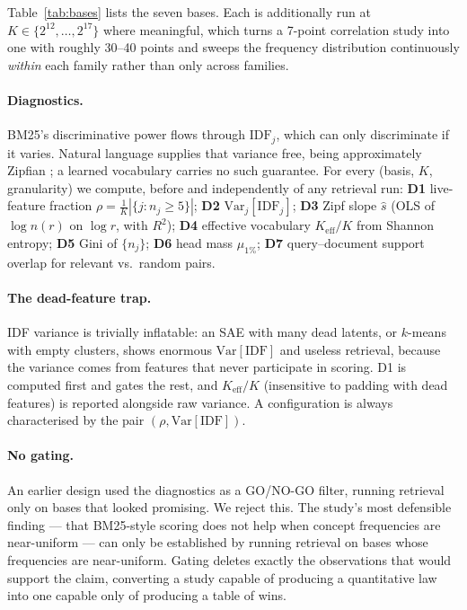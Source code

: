 \documentclass[11pt]{article}
\newcommand{\idf}{\mathrm{IDF}}
\begin{document}
Table~\ref{tab:bases} lists the seven bases. Each is additionally run at $K\in\{2^{12},\dots,2^{17}\}$ where meaningful, which turns a 7-point correlation study into one with roughly 30--40 points and sweeps the frequency distribution continuously \emph{within} each family rather than only across families.

\paragraph{Diagnostics.} BM25's discriminative power flows through $\idf_j$, which can only discriminate if it varies. Natural language supplies that variance free, being approximately Zipfian \citep{zipf1932}; a learned vocabulary carries no such guarantee. For every (basis, $K$, granularity) we compute, before and independently of any retrieval run: \textbf{D1} live-feature fraction $\rho=\frac{1}{K}|\{j:n_j\geq 5\}|$; \textbf{D2} $\mathrm{Var}_j[\idf_j]$; \textbf{D3} Zipf slope $\hat s$ (OLS of $\log n(r)$ on $\log r$, with $R^2$); \textbf{D4} effective vocabulary $K_{\text{eff}}/K$ from Shannon entropy; \textbf{D5} Gini of $\{n_j\}$; \textbf{D6} head mass $\mu_{1\%}$; \textbf{D7} query--document support overlap for relevant vs.\ random pairs.

\paragraph{The dead-feature trap.} IDF variance is trivially inflatable: an SAE with many dead latents, or $k$-means with empty clusters, shows enormous $\mathrm{Var}[\idf]$ and useless retrieval, because the variance comes from features that never participate in scoring. D1 is computed first and gates the rest, and $K_{\text{eff}}/K$ (insensitive to padding with dead features) is reported alongside raw variance. A configuration is always characterised by the pair $(\rho,\mathrm{Var}[\idf])$.

\paragraph{No gating.} An earlier design used the diagnostics as a GO/NO-GO filter, running retrieval only on bases that looked promising. We reject this. The study's most defensible finding --- that BM25-style scoring does not help when concept frequencies are near-uniform --- can only be established by running retrieval on bases whose frequencies are near-uniform. Gating deletes exactly the observations that would support the claim, converting a study capable of producing a quantitative law into one capable only of producing a table of wins.
\end{document}
